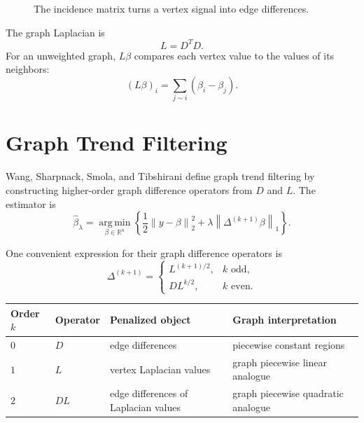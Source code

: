 \documentclass[11pt]{article}
\newcommand{\R}{\mathbb R}
\newcommand{\norm}[1]{\left\lVert #1 \right\rVert}
\newcommand{\argmin}{\operatorname*{arg\,min}}
\begin{document}
\begin{figure}[ht]
\centering
{}
\caption{The incidence matrix turns a vertex signal into edge differences.}
\end{figure}

The graph Laplacian is
\[
  L = D^T D.
\]
For an unweighted graph, \(L\beta\) compares each vertex value to the values of
its neighbors:
\[
  (L\beta)_i
  =
  \sum_{j\sim i}(\beta_i-\beta_j).
\]

\section{Graph Trend Filtering}

Wang, Sharpnack, Smola, and Tibshirani define graph trend filtering by
constructing higher-order graph difference operators from \(D\) and \(L\).  The
estimator is
\[
  \widehat\beta_\lambda
  =
  \argmin_{\beta\in\R^n}
  \left\{
  \frac{1}{2}\norm{y-\beta}_2^2
  +
  \lambda\norm{\Delta^{(k+1)}\beta}_1
  \right\}.
\]

One convenient expression for their graph difference operators is
\[
  \Delta^{(k+1)}
  =
  \begin{cases}
  L^{(k+1)/2}, & k \text{ odd},\\[1mm]
  D L^{k/2}, & k \text{ even}.
  \end{cases}
\]

\begin{center}
\begin{tabular}{llll}
\toprule
Order \(k\) & Operator & Penalized object & Graph interpretation\\
\midrule
\(0\) & \(D\) & edge differences & piecewise constant regions\\
\(1\) & \(L\) & vertex Laplacian values & graph piecewise linear analogue\\
\(2\) & \(DL\) & edge differences of Laplacian values & graph piecewise quadratic analogue\\
\bottomrule
\end{tabular}
\end{center}
\end{document}
